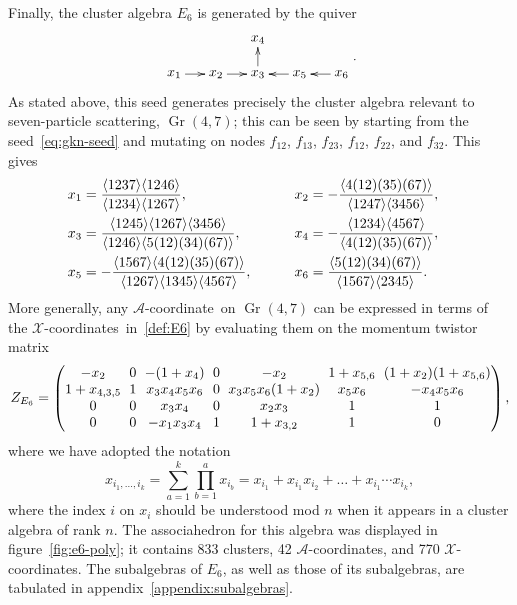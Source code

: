 \documentclass[11pt]{article}
\DeclareMathOperator{\Gr}{Gr}
\def\ket#1{\langle #1 \rangle}
\def\xcoords{$\mathcal{X}$-coordinates}
\def\acoord{$\mathcal{A}$-coordinate}
\def\acoords{$\mathcal{A}$-coordinates}
\begin{document}
Finally, the cluster algebra $E_6$ is generated by the quiver
\begin{equation}\label{def:E6}
    \begin{gathered}
    \begin{xy} 0;<1pt,0pt>:<0pt,-1pt>::
      (0,0) *+{x_1} ="1",
      (30,0) *+{x_2} ="2",
      (60,0) *+{x_3} ="3",
      (60,-25) *+{x_4} ="4",
      (90,0) *+{x_5} ="5",
      (120,0) *+{x_6} ="6",
      "1", {\ar"2"},
      "2", {\ar"3"},
      "3", {\ar"4"},
      "5", {\ar"3"},
      "6", {\ar"5"},
    \end{xy}
    \end{gathered} .
\end{equation}
As stated above, this seed generates precisely the cluster algebra relevant to seven-particle scattering, $\Gr(4,7)$; this can be seen by starting from the seed~\eqref{eq:gkn-seed} and mutating on nodes $f_{12}$, $f_{13}$, $f_{23}$, $f_{12}$, $f_{22}$, and $f_{32}$. This gives
\begin{align}
x_1 &= \frac{\ket{1237} \ket{1246}}{\ket{1234}\ket{1267}}, \hspace{13.03ex} \quad \quad x_2 = - \frac{\ket{4(12)(35)(67)}}{\ket{1247} \ket{3456}}, \quad \nonumber \\
x_3 &= \frac{\ket{1245} \ket{1267} \ket{3456}}{\ket{1246} \ket{5(12)(34)(67)}}, \hspace{4.12ex} \quad \quad x_4 = -\frac{\ket{1234} \ket{4567}}{\ket{4(12)(35)(67)}}, \quad \\
 x_5 &= -\frac{\ket{1567}\ket{4(12)(35)(67)}}{\ket{1267} \ket{1345}\ket{4567}}, \quad \quad \quad x_6 = \frac{\ket{5(12)(34)(67)}}{\ket{1567}\ket{2345}}. \quad \nonumber
\end{align}
More generally, any \acoord\ on $\Gr(4,7)$ can be expressed in terms of the \xcoords\ in~\eqref{def:E6} by evaluating them on the momentum twistor matrix 
\begin{equation}
Z_{E_6} = 
\begingroup
\setlength\arraycolsep{3pt}
\begin{pmatrix} 
 -x_2 & 0 & -(1+x_4) & 0 & -x_2 & 1+x_{5,6} & (1+x_2) (1+x_{5,6}) \\
 1+x_{4,3,5} & 1 & x_3 x_4 x_5 x_6 & 0 & x_3 x_5 x_6 (1+x_2) & x_5 x_6 & -x_4 x_5 x_6 \\
 0 & 0 & x_3 x_4 & 0 & x_2 x_3 & 1 & 1 \\
 0 & 0 & -x_1 x_3 x_4 & 1 & 1+x_{3,2} & 1 & 0 \\
\end{pmatrix} ,
\endgroup
\end{equation}
where we have adopted the notation
\begin{equation}
	x_{i_1,\ldots, i_k} = \sum_{a=1}^k \prod_{b=1}^a x_{i_b} = x_{i_1}+x_{i_1}x_{i_2} + \ldots + x_{i_1}\cdots x_{i_k},
\end{equation}
where the index $i$ on $x_i$ should be understood mod $n$ when it appears in a cluster algebra of rank $n$. The associahedron for this algebra was displayed in figure~\ref{fig:e6-poly}; it contains 833 clusters, 42 \acoords, and 770 \xcoords. The subalgebras of $E_6$, as well as those of its subalgebras, are tabulated in appendix~\ref{appendix:subalgebras}.
\end{document}
